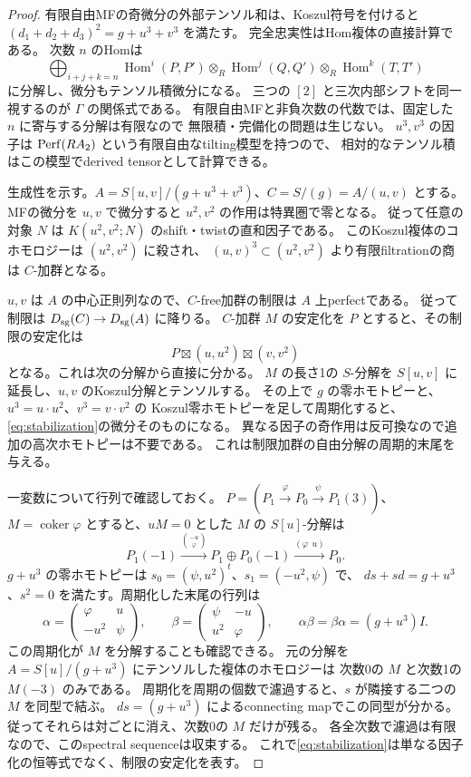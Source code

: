 \begin{proof}
有限自由MFの奇微分の外部テンソル和は、Koszul符号を付けると
$(d_1+d_2+d_3)^2=g+u^3+v^3$ を満たす。
完全忠実性はHom複体の直接計算である。
次数 $n$ のHomは
\[
 \bigoplus_{i+j+k=n}
 \operatorname{Hom}^i(P,P')\otimes_R
 \operatorname{Hom}^j(Q,Q')\otimes_R
 \operatorname{Hom}^k(T,T')
\]
に分解し、微分もテンソル積微分になる。
三つの $[2]$ と三次内部シフトを同一視するのが $\Gamma$ の関係式である。
有限自由MFと非負次数の代数では、固定した $n$ に寄与する分解は有限なので
無限積・完備化の問題は生じない。
$u^3,v^3$ の因子は $\operatorname{Perf}(RA_2)$ という有限自由なtilting模型を持つので、
相対的なテンソル積はこの模型でderived tensorとして計算できる。

生成性を示す。$A=S[u,v]/(g+u^3+v^3)$、$C=S/(g)=A/(u,v)$ とする。
MFの微分を $u,v$ で微分すると $u^2,v^2$ の作用は特異圏で零となる。
従って任意の対象 $N$ は $K(u^2,v^2;N)$ のshift・twistの直和因子である。
このKoszul複体のコホモロジーは $(u^2,v^2)$ に殺され、
$(u,v)^3\subset(u^2,v^2)$ より有限filtrationの商は $C$-加群となる。

$u,v$ は $A$ の中心正則列なので、$C$-free加群の制限は $A$ 上perfectである。
従って制限は $D_{\mathrm{sg}}(C)\to D_{\mathrm{sg}}(A)$ に降りる。
$C$-加群 $M$ の安定化を $P$ とすると、その制限の安定化は
\begin{equation}\label{eq:stabilization}
 P\boxtimes(u,u^2)\boxtimes(v,v^2)
\end{equation}
となる。これは次の分解から直接に分かる。
$M$ の長さ1の $S$-分解を $S[u,v]$ に延長し、$u,v$ のKoszul分解とテンソルする。
その上で $g$ の零ホモトピーと、$u^3=u\cdot u^2$、$v^3=v\cdot v^2$ の
Koszul零ホモトピーを足して周期化すると、\eqref{eq:stabilization}の微分そのものになる。
異なる因子の奇作用は反可換なので追加の高次ホモトピーは不要である。
これは制限加群の自由分解の周期的末尾を与える。

一変数について行列で確認しておく。
$P=(P_1\xrightarrow\varphi P_0\xrightarrow\psi P_1(3))$、$M=\operatorname{coker}\varphi$
とすると、$uM=0$ とした $M$ の $S[u]$-分解は
\[
 P_1(-1)\xrightarrow{\binom{-u}{\varphi}}
 P_1\oplus P_0(-1)\xrightarrow{(\varphi\ \ u)}P_0.
\]
$g+u^3$ の零ホモトピーは $s_0=(\psi,u^2)^t$、$s_1=(-u^2,\psi)$ で、
$ds+sd=g+u^3$、$s^2=0$ を満たす。周期化した末尾の行列は
\[
 \alpha=\begin{pmatrix}\varphi&u\\-u^2&\psi\end{pmatrix},
 \qquad
 \beta=\begin{pmatrix}\psi&-u\\u^2&\varphi\end{pmatrix},
 \qquad \alpha\beta=\beta\alpha=(g+u^3)I.
\]
この周期化が $M$ を分解することも確認できる。
元の分解を $A=S[u]/(g+u^3)$ にテンソルした複体のホモロジーは
次数0の $M$ と次数1の $M(-3)$ のみである。
周期化を周期の個数で濾過すると、$s$ が隣接する二つの $M$ を同型で結ぶ。
$ds=(g+u^3)$ によるconnecting mapでこの同型が分かる。
従ってそれらは対ごとに消え、次数0の $M$ だけが残る。
各全次数で濾過は有限なので、このspectral sequenceは収束する。
これで\eqref{eq:stabilization}は単なる因子化の恒等式でなく、制限の安定化を表す。


\end{proof}
